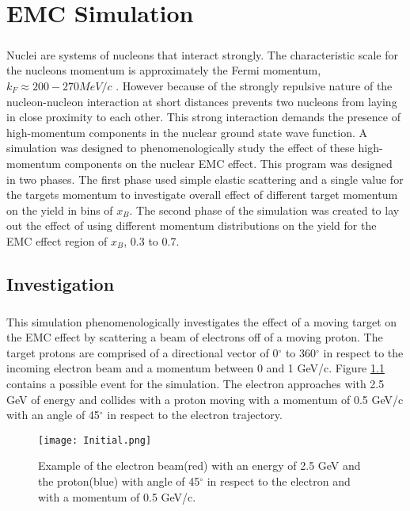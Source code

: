 \renewcommand{\textfraction}{0.45}
\chapter{EMC Simulation}\label{A:EMCsim}
\paragraph{}Nuclei are systems of nucleons that interact strongly. The characteristic scale for the nucleons momentum is approximately the Fermi momentum, $k_F \approx 200-270 MeV/c$ \cite{gomez}. However because of the strongly repulsive nature of the nucleon-nucleon interaction at short distances prevents two nucleons from laying in close proximity to each other. This strong interaction demands the presence of high-momentum components in the nuclear ground state wave function. A simulation was designed to phenomenologically study the effect of these high-momentum components on the nuclear EMC effect. This program was designed in two phases. The first phase used simple elastic scattering and a single value for the targets momentum to investigate overall effect of different target momentum on the yield in bins of $x_B$. The second phase of the simulation was created to lay out the effect of using different momentum distributions on the yield for the EMC effect region of $x_B$, 0.3 to 0.7.
\section{Investigation} \paragraph{}This simulation phenomenologically investigates the effect of a moving target on the EMC effect by scattering a beam of electrons off of a moving proton. The target protons are comprised of a directional vector of 0$^\circ$ to 360$^\circ$ in respect to the incoming electron beam and a momentum between 0 and 1 GeV/c. Figure \ref{example} contains a possible event for the simulation. The electron approaches with 2.5 GeV of energy and collides with a proton moving with a momentum of 0.5 GeV/c with an angle of 45$^\circ$ in respect to the electron trajectory. 
\begin{figure}[t]
\centering
\texttt{[image: Initial.png]}
\caption{Example of the electron beam(red) with an energy of 2.5 GeV and the proton(blue) with angle of 45$^\circ$ in respect to the electron and with a momentum of 0.5 GeV/c.}
\label{example}
\end{figure}
